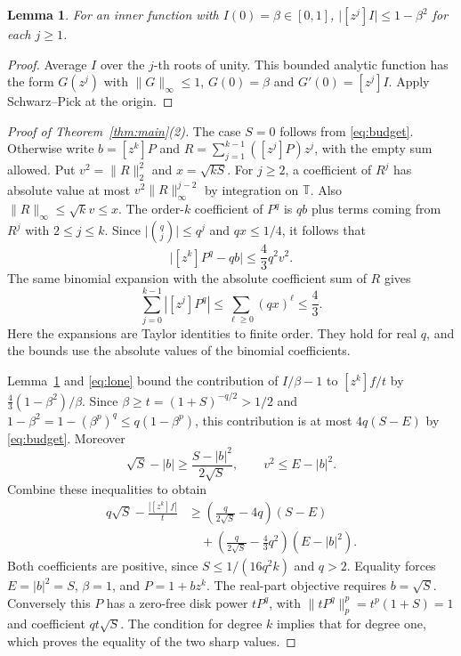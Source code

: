 \documentclass[11pt]{article}
\numberwithin{equation}{section}
\newtheorem{lemma}[theorem]{Lemma}
\theoremstyle{remark}
\newcommand{\T}{\mathbb T}
\newcommand{\norm}[1]{\lVert #1\rVert}
\newcommand{\coef}[1]{[z^{#1}]}
\begin{document}
\begin{lemma}\label{lem:inner}
For an inner function with \(I(0)=\beta\in[0,1]\),
\(\lvert\coef{j}I\rvert\le1-\beta^2\) for each \(j\ge1\).
\end{lemma}
\begin{proof}
Average \(I\) over the \(j\)-th roots of unity. This bounded
analytic function has the form \(G(z^j)\) with
\(\norm{G}_\infty\le1\), \(G(0)=\beta\) and
\(G'(0)=\coef{j}I\). Apply Schwarz--Pick at the origin.
\end{proof}

\begin{proof}[Proof of Theorem~\ref{thm:main}(2)]
The case \(S=0\) follows from \eqref{eq:budget}. Otherwise write
\(b=\coef{k}P\) and \(R=\sum_{j=1}^{k-1}(\coef{j}P)z^j\), with the
empty sum allowed. Put \(v^2=\norm{R}_2^2\) and
\(x=\sqrt{kS}\). For \(j\ge2\), a coefficient of \(R^j\) has absolute
value at most \(v^2\norm{R}_\infty^{j-2}\) by integration on
\(\T\). Also \(\norm{R}_\infty\le\sqrt{k}v\le x\).
The order-\(k\) coefficient of \(P^q\) is \(qb\) plus terms coming
from \(R^j\) with \(2\le j\le k\). Since
\(\lvert\binom{q}{j}\rvert\le q^j\) and \(qx\le 1/4\), it follows that
\begin{equation}\label{eq:curv}
   \lvert\coef{k}P^q-qb\rvert\le\frac43 q^2 v^2.
\end{equation}
The same binomial expansion with the absolute coefficient sum of
\(R\) gives
\begin{equation}\label{eq:lone}
   \sum_{j=0}^{k-1}|\coef{j}P^q|
     \le \sum_{\ell\ge0}(qx)^\ell \le \frac43 .
\end{equation}
Here the expansions are Taylor identities to finite order. They
hold for real \(q\), and the bounds use the absolute values of
the binomial coefficients.

Lemma~\ref{lem:inner} and \eqref{eq:lone} bound the contribution of
\(I/\beta-1\) to \(\coef{k}f/t\) by
\(\tfrac43(1-\beta^2)/\beta\). Since
\(\beta\ge t=(1+S)^{-q/2}>1/2\) and
\(1-\beta^2=1-(\beta^p)^q\le q(1-\beta^p)\), this contribution
is at most \(4q(S-E)\) by \eqref{eq:budget}.
Moreover
\[
 \sqrt S-|b|\ge\frac{S-|b|^2}{2\sqrt S},\qquad
 v^2\le E-|b|^2.
\]
Combine these inequalities to obtain
\begin{align*}
 q\sqrt S-\frac{|\coef{k}f|}{t}
 &\ge \left(\frac{q}{2\sqrt S}-4q\right)(S-E)\\
 &\quad+\left(\frac{q}{2\sqrt S}-\frac43q^2\right)(E-|b|^2).
\end{align*}
Both coefficients are positive, since
\(S\le1/(16q^2k)\) and \(q>2\).
Equality forces \(E=|b|^2=S\), \(\beta=1\), and
\(P=1+bz^k\). The real-part objective requires \(b=\sqrt S\).
Conversely this \(P\) has a zero-free disk power \(tP^q\), with
\(\norm{tP^q}_p^p=t^p(1+S)=1\) and coefficient \(qt\sqrt S\).
The condition for degree \(k\) implies that for degree one,
which proves the equality of the two sharp values.
\end{proof}
\end{document}
